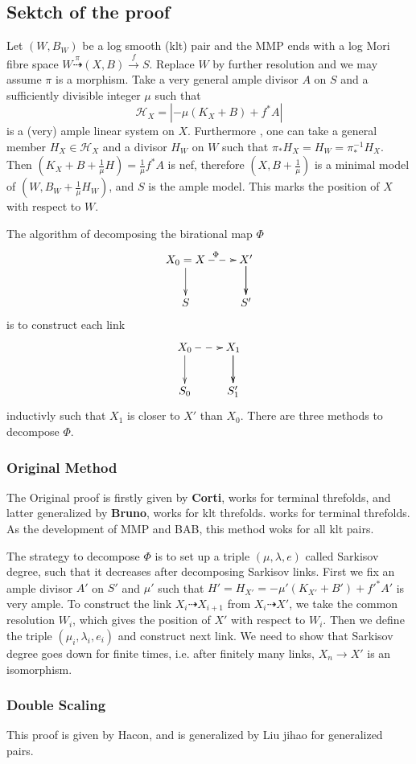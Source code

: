 \documentclass{article}
\begin{document}
\subsection{Sektch of the proof}
Let $(W,B_W)$ be a log smooth (klt) pair and the MMP ends with a log Mori fibre space $ W\overset{\pi}{\dashrightarrow}(X,B)\xrightarrow{f} S$. Replace $W$ by further resolution and we may assume $\pi$ is a morphism. Take a very general ample divisor $A$ on $S$ and a sufficiently divisible integer $\mu$ such that 
\[
  \mathcal{H}_X=|-\mu(K_X+B)+f^*A|
\]
is a (very) ample linear system on $X$. Furthermore , one can take a general member $H_X\in \mathcal{H}_X $ and a divisor $H_W$ on $W$ such that $\pi_*H_X=H_W=\pi^{-1}_*H_{X}$. Then $(K_X+B+\frac{1}{\mu}H)=\frac{1}{\mu}f^*A$ is nef, therefore $(X,B+\frac{1}{\mu})$ is a minimal model of $(W,B_W+\frac{1}{\mu}H_W)$, and $S$ is the ample model. This marks the position of $X$ with respect to $W$.

The algorithm of decomposing the birational map $\Phi$
\[
  \xymatrix{
    X_{0}=X\ar[d]\ar@{-->}[r]^\Phi &\ar[d] X'\ar[d] \\
    S& S'
  }
\]
is to construct each link 
\[
  \xymatrix{
    X_{0}\ar[d]\ar@{-->}[r] &\ar[d] X_{1}\ar[d] \\
  S_{0}& S_{1}'}
\]
inductivly such that $X_{1}$ is closer to $X'$ than $X_{0}$. There are three methods to decompose $\Phi$.
\subsubsection{Original Method}
The Original proof is firstly given by \textbf{Corti}, works for terminal threfolds, and latter generalized by \textbf{Bruno}, works for klt threfolds. works for terminal threfolds. As the development of MMP and BAB, this method woks for all klt pairs.

The strategy to decompose $\Phi$ is to set up a triple $(\mu,\lambda,e)$ called Sarkisov degree, such that it decreases after decomposing Sarkisov links. First we fix an ample divisor $A'$ on $S'$ and $\mu'$ such that $H'=H_{X'}=-\mu'(K_{X'}+B')+f'^*A'$ is very ample. To construct the link $X_i\dashrightarrow X_{i+1}$ from $X_i\dashrightarrow X'$, we take the common resolution $W_i$, which gives the position of $X'$ with respect to $W_i$. Then we define the triple $(\mu_i,\lambda_i,e_i)$ and construct next link. We need to show that Sarkisov degree goes down for finite times, i.e. after finitely many links, $X_n\to X' $ is an isomorphism.
\subsubsection{Double Scaling}
This proof is given by Hacon, and is generalized by Liu jihao for generalized pairs.
\end{document}
